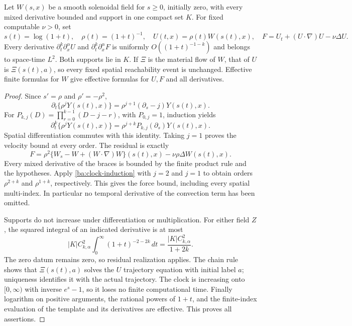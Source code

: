 \begin{lemma}
\label{ba:log-clock}
Let $W(s,x)$ be a smooth solenoidal field for $s\ge0$, initially zero,
with every mixed derivative bounded and support in one compact set $K$.
For fixed computable $\nu>0$, set
\[
 s(t)=\log(1+t),\quad \rho(t)=(1+t)^{-1},\quad
 U(t,x)=\rho(t)W(s(t),x),\quad
 F=U_t+(U\cdot\nabla)U-\nu\Delta U.
\]
Every derivative $\partial_t^k\partial_x^\alpha U$ and
$\partial_t^k\partial_x^\alpha F$ is uniformly
$O((1+t)^{-1-k})$ and belongs to space-time $L^2$.
Both supports lie in $K$.  If $\Xi$ is the material flow of $W$, that
of $U$ is $\Xi(s(t),a)$, so every fixed spatial reachability event is
unchanged.  Effective finite formulas for $W$ give effective formulas
for $U,F$ and all derivatives.
\end{lemma}
\begin{proof}\label{ba:log-clock-proof}
Since $s'=\rho$ and $\rho'=-\rho^2$,
\begin{equation}\label{ba:clock-rule}
 \partial_t\{\rho^jY(s(t),x)\}
       =\rho^{j+1}(\partial_s-j)Y(s(t),x).
\end{equation}
For $P_{k,j}(D)=\prod_{r=0}^{k-1}(D-j-r)$, with $P_{0,j}=1$,
induction yields
\begin{equation}\label{ba:clock-induction}
 \partial_t^k\{\rho^jY(s(t),x)\}
       =\rho^{j+k}P_{k,j}(\partial_s)Y(s(t),x).
\end{equation}
Spatial differentiation commutes with this identity.  Taking $j=1$
proves the velocity bound at every order.  The residual is exactly
\begin{equation}\label{ba:clock-residual}
 F=\rho^2\{W_s-W+(W\cdot\nabla)W\}(s(t),x)
       -\nu\rho\Delta W(s(t),x).
\end{equation}
Every mixed derivative of the braces is bounded by the finite product
rule and the hypotheses.  Apply \eqref{ba:clock-induction} with $j=2$
and $j=1$ to obtain orders $\rho^{2+k}$ and $\rho^{1+k}$,
respectively.  This gives the force bound, including every spatial
multi-index.  In particular no temporal derivative of the convection
term has been omitted.

Supports do not increase under differentiation or multiplication.
For either field $Z$, the squared integral of an indicated derivative
is at most
\[
 |K|C_{k,\alpha}^2\int_0^\infty(1+t)^{-2-2k}\,dt
       =\frac{|K|C_{k,\alpha}^2}{1+2k}.
\]
The zero datum remains zero, so residual realization applies.
The chain rule shows that $\Xi(s(t),a)$ solves the $U$ trajectory
equation with initial label $a$; uniqueness identifies it with the
actual trajectory.  The clock is increasing onto $[0,\infty)$ with
inverse $e^s-1$, so it loses no finite computational time.  Finally
logarithm on positive arguments, the rational powers of $1+t$, and
the finite-index evaluation of the template and its derivatives are
effective.  This proves all assertions.
\end{proof}


